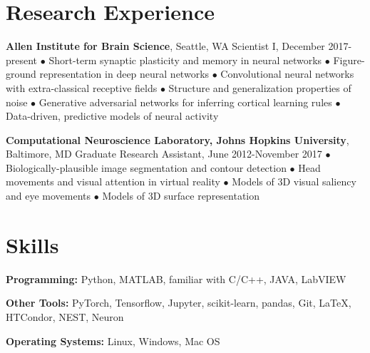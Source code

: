 \documentclass[10pt,letterpaper]{article}
\renewenvironment{itemize}{
  \begin{list}{}{
    \setlength{\leftmargin}{1.5em}
    \setlength{\itemsep}{0.25em}
    \setlength{\parskip}{0pt}
    \setlength{\parsep}{0.25em}
  }
}{
  \end{list}
}
\begin{document}
\section*{Research Experience}
\vspace{-0.05in}
\begin{itemize}
  \item \textbf{Allen Institute for Brain Science}, Seattle, WA
  \subitem Scientist I, December 2017-present
  \subitem$\bullet$ Short-term synaptic plasticity and memory in neural networks
  \subitem$\bullet$ Figure-ground representation in deep neural networks
  \subitem$\bullet$ Convolutional neural networks with extra-classical receptive fields
  \subitem$\bullet$ Structure and generalization properties of noise
  \subitem$\bullet$ Generative adversarial networks for inferring cortical learning rules
  \subitem$\bullet$ Data-driven, predictive models of neural activity
  
  \item \textbf{Computational Neuroscience Laboratory, Johns Hopkins University}, Baltimore, MD
  \subitem Graduate Research Assistant, June 2012-November 2017
  \subitem$\bullet$ Biologically-plausible image segmentation and contour detection
  \subitem$\bullet$ Head movements and visual attention in virtual reality
  \subitem$\bullet$ Models of 3D visual saliency and eye movements
  \subitem$\bullet$ Models of 3D surface representation
\end{itemize}

\vspace{-0.25in}

\section*{Skills}
\vspace{-0.05in}
\hspace{1.5em}\textbf{Programming:} Python, MATLAB, familiar with C/C++, JAVA, LabVIEW

\hspace{1.5em}\textbf{Other Tools:} PyTorch, Tensorflow, Jupyter, scikit-learn, pandas, Git, \LaTeX, HTCondor, NEST, Neuron

\hspace{1.5em}\textbf{Operating Systems:} Linux, Windows, Mac OS

\vspace{-0.1in}
\end{document}

